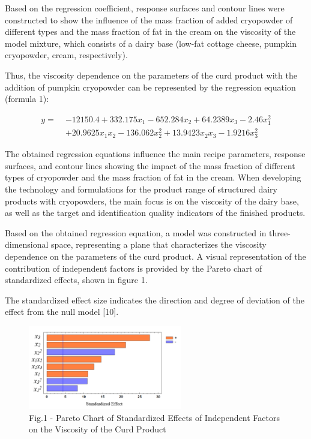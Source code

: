 \begin{multicols}{2}
Based on the regression coefficient, response surfaces and contour lines
were constructed to show the influence of the mass fraction of added
cryopowder of different types and the mass fraction of fat in the cream
on the viscosity of the model mixture, which consists of a dairy base
(low-fat cottage cheese, pumpkin cryopowder, cream, respectively).

Thus, the viscosity dependence on the parameters of the curd product
with the addition of pumpkin cryopowder can be represented by the
regression equation (formula 1):
\end{multicols}

\begin{align}
y =\; & -12150.4 + 332.175x_1 - 652.284x_2 + 64.2389x_3 - 2.46x_1^2 \nonumber \\
     & + 20.9625x_1x_2 - 136.062x_2^2 + 13.9423x_2x_3 - 1.9216x_3^2
\end{align}

\begin{multicols}{2}
The obtained regression equations influence the main recipe parameters,
response surfaces, and contour lines showing the impact of the mass
fraction of different types of cryopowder and the mass fraction of fat
in the cream. When developing the technology and formulations for the
product range of structured dairy products with cryopowders, the main
focus is on the viscosity of the dairy base, as well as the target and
identification quality indicators of the finished products.

Based on the obtained regression equation, a model was constructed in
three-dimensional space, representing a plane that characterizes the
viscosity dependence on the parameters of the curd product. A visual
representation of the contribution of independent factors is provided by
the Pareto chart of standardized effects, shown in figure 1.

The standardized effect size indicates the direction and degree of
deviation of the effect from the null model {[}10{]}.
\end{multicols}

\begin{figure}[H]
	\centering
	\includegraphics[width=0.6\textwidth]{media/pish2/image81}
	\caption*{Fig.1 - Pareto Chart of Standardized Effects of Independent Factors on the Viscosity of the Curd Product}
\end{figure}

